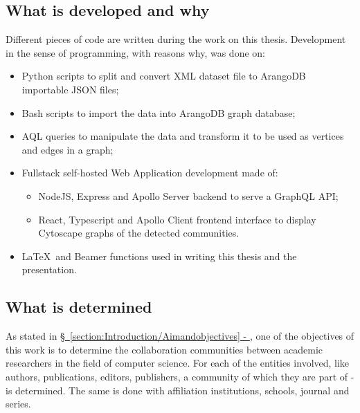 \subsection{What is developed and why} \label{subsection:Introduction/Aimandobjectives/Whatisexplored}
Different pieces of code are written during the work on this thesis.
Development in the sense of programming, with reasons why, was done on:
 \begin{itemize}[noitemsep]
	\item \gls{Python} scripts to split and convert XML dataset file to ArangoDB importable JSON files;
	\item Bash scripts to import the data into ArangoDB graph database;
	\item \acrshort{AQL} queries to manipulate the data and transform it to be used as vertices and edges in a graph;
	\item Fullstack self-hosted \gls{Web Application} development made of:
		 \begin{itemize}[noitemsep]
			\item NodeJS, \gls{Express} and \gls{Apollo Server} backend to serve a \gls{GraphQL} \acrshort{API};
			\item React, Typescript and \gls{Apollo Client} frontend interface to display \gls{Cytoscape} graphs of the detected communities.
		\end{itemize}
	\item \LaTeX\ and Beamer functions used in writing this thesis and the presentation.
\end{itemize}

\subsection{What is determined} \label{subsection:Introduction/Aimandobjectives/Whatisdetermined}
As stated in \hyperref[section:Introduction/Aimandobjectives]{\S\ \ref{section:Introduction/Aimandobjectives} - }, one of the objectives of this work is to determine the collaboration communities between academic researchers in the field of computer science.
For each of the entities involved, like authors, publications, editors, publishers, a community of which they are part of - is determined.
The same is done with affiliation institutions, schools, journal and series.

